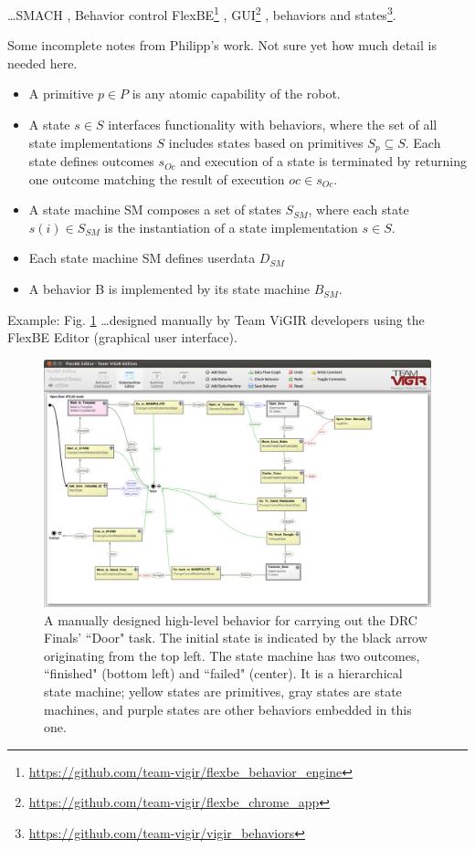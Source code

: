 \ldots SMACH \cite{SMACH2010RAM}, Behavior control \cite{Philipp2013Bsc, Philipp2015Msc} FlexBE\footnote{\scriptsize{\url{https://github.com/team-vigir/flexbe_behavior_engine}}}
, GUI\footnote{\scriptsize{\url{https://github.com/team-vigir/flexbe_chrome_app}}}
, behaviors and states\footnote{\scriptsize{\url{https://github.com/team-vigir/vigir_behaviors}}}.

Some incomplete notes from Philipp's work. Not sure yet how much detail is needed here.
\begin{itemize}
	\item A primitive $p \in P$ is any atomic capability of the robot.
	\item A state $s \in S$ interfaces functionality with behaviors, where the set of all state implementations $S$ includes states based on primitives $S_p \subseteq S$. Each state defines outcomes $s_{Oc}$ and execution of a state is terminated by returning one outcome matching the result of execution $oc \in s_{Oc}$.
	\item A state machine SM composes a set of states $S_{SM}$, where each state $s(i) \in S_{SM}$ is the instantiation of a state implementation $s \in S$.
	\item Each state machine SM defines userdata $D_{SM}$
	\item A behavior B is implemented by its state machine $B_{SM}$.
\end{itemize}

Example: Fig. \ref{Fig:FlexBESM} \ldots designed manually by Team ViGIR developers using the FlexBE Editor (graphical user interface).

\begin{figure}[t]
\centering
\includegraphics[width=0.99\columnwidth,clip]{./img/behavior_open_door.png}
\caption{A manually designed high-level behavior for carrying out the DRC Finals' ``Door" task.
The initial state is indicated by the black arrow originating from the top left.
The state machine has two outcomes, ``finished" (bottom left) and ``failed" (center).
It is a hierarchical state machine;
yellow states are primitives, gray states are state machines, and purple states are other behaviors embedded in this one.
}
\label{Fig:FlexBESM}
\end{figure}

